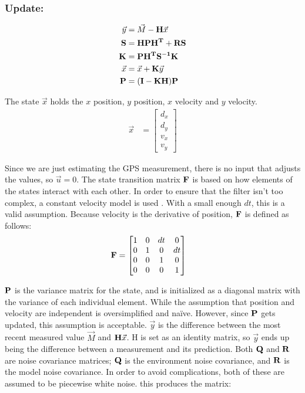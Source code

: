 \subsubsection*{Update:}
\begin{align}
    \vec{y} &= \vec{M} - \mathbf{H}\vec{x} \label{eq:innovation_up}\\
    \mathbf{S}&= \mathbf{HPH^T+RS} \label{eq:inter_up}\\
    \mathbf{K} &= \mathbf{PH^TS^{-1}K} \label{eq:kalgain_up}\\
    \vec{x} &= \vec{x} + \mathbf{K}\vec{y} \label{eq:state_up}\\
    \mathbf{P} &= \mathbf{(I-KH)P} \label{eq:var_up}
\end{align} \par
The state $\vec{x}$ holds the $x$ position, $y$ position, $x$ velocity and $y$ velocity. \\
\begin{align}
	\vec{x} &= \begin{bmatrix}
				d_x \\
				d_y\\
				v_x\\
				v_y
				\end{bmatrix}
\end{align}\par
Since we are just estimating the GPS measurement, there is no input that adjusts the values, so $\vec{u} = 0$. The state transition matrix $\mathbf{F}$ is based on how elements of the states interact with each other. In order to ensure that the filter isn't too complex, a constant velocity model is used \cite{kf_book}. With a small enough $dt$, this is a valid assumption. Because velocity is the derivative of position, $\mathbf{F}$ is defined as follows: 
\begin{align}
	\mathbf{F} &= \begin{bmatrix}
					1 & 0 & dt & 0 \\
					0 & 1 & 0 & dt \\
					0 & 0 & 1 & 0 \\
					0 & 0 & 0 & 1
				\end{bmatrix}
\end{align} \par
$\mathbf{P}$ is the variance matrix for the state, and is initialized as a diagonal matrix with the variance of each individual element. While the assumption that position and velocity are independent is oversimplified and na{\"i}ve. However, since $\mathbf{P}$ gets updated, this assumption is acceptable. 
$\vec{y}$ is the difference between the most recent measured value $\vec{M}$ and $\mathbf{H}\vec{x}$. H is set as an identity matrix, so $\vec{y}$ ends up being the difference between a measurement and its prediction. 
Both $\mathbf{Q}$ and $\mathbf{R}$ are noise covariance matrices; $\mathbf{Q}$ is the environment noise covariance, and $\mathbf{R}$ is the model noise covariance. In order to avoid complications, both of these are assumed to be piecewise white noise. this produces the matrix: 

